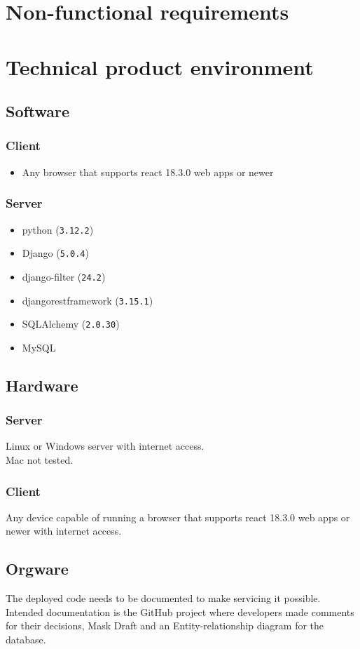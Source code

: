 \documentclass[]{article}
\begin{document}
\section{Non-functional requirements}
\section{Technical product environment}
	\subsection{Software}
		\subsubsection{Client}
			\begin{itemize}
				\item Any browser that supports react 18.3.0 web apps or newer
			\end{itemize}
		\subsubsection{Server}
			\begin{itemize}
				\item python (\texttt{3.12.2})
				\item Django (\texttt{5.0.4})
				\item django-filter (\texttt{24.2})
				\item djangorestframework (\texttt{3.15.1})
				\item SQLAlchemy (\texttt{2.0.30})
				\item MySQL
			\end{itemize}
	\subsection{Hardware}
		\subsubsection{Server}
			Linux or Windows server with internet access.\\
			Mac not tested.
		\subsubsection{Client}
			Any device capable of running a browser that supports react 18.3.0 web apps or newer with internet access.
	\subsection{Orgware}
		The deployed code needs to be documented to make servicing it possible. Intended documentation is the GitHub project where developers made comments for their decisions, Mask Draft and an Entity-relationship diagram for the database.
\end{document}
